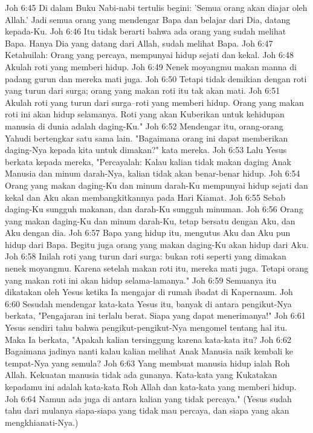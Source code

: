Joh 6:45  Di dalam Buku Nabi-nabi tertulis begini: 'Semua orang akan diajar oleh Allah.' Jadi semua orang yang mendengar Bapa dan belajar dari Dia, datang kepada-Ku.
Joh 6:46  Itu tidak berarti bahwa ada orang yang sudah melihat Bapa. Hanya Dia yang datang dari Allah, sudah melihat Bapa.
Joh 6:47  Ketahuilah: Orang yang percaya, mempunyai hidup sejati dan kekal.
Joh 6:48  Akulah roti yang memberi hidup.
Joh 6:49  Nenek moyangmu makan manna di padang gurun dan mereka mati juga.
Joh 6:50  Tetapi tidak demikian dengan roti yang turun dari surga; orang yang makan roti itu tak akan mati.
Joh 6:51  Akulah roti yang turun dari surga--roti yang memberi hidup. Orang yang makan roti ini akan hidup selamanya. Roti yang akan Kuberikan untuk kehidupan manusia di dunia adalah daging-Ku."
Joh 6:52  Mendengar itu, orang-orang Yahudi bertengkar satu sama lain. "Bagaimana orang ini dapat memberikan daging-Nya kepada kita untuk dimakan?" kata mereka.
Joh 6:53  Lalu Yesus berkata kepada mereka, "Percayalah: Kalau kalian tidak makan daging Anak Manusia dan minum darah-Nya, kalian tidak akan benar-benar hidup.
Joh 6:54  Orang yang makan daging-Ku dan minum darah-Ku mempunyai hidup sejati dan kekal dan Aku akan membangkitkannya pada Hari Kiamat.
Joh 6:55  Sebab daging-Ku sungguh makanan, dan darah-Ku sungguh minuman.
Joh 6:56  Orang yang makan daging-Ku dan minum darah-Ku, tetap bersatu dengan Aku, dan Aku dengan dia.
Joh 6:57  Bapa yang hidup itu, mengutus Aku dan Aku pun hidup dari Bapa. Begitu juga orang yang makan daging-Ku akan hidup dari Aku.
Joh 6:58  Inilah roti yang turun dari surga: bukan roti seperti yang dimakan nenek moyangmu. Karena setelah makan roti itu, mereka mati juga. Tetapi orang yang makan roti ini akan hidup selama-lamanya."
Joh 6:59  Semuanya itu dikatakan oleh Yesus ketika Ia mengajar di rumah ibadat di Kapernaum.
Joh 6:60  Sesudah mendengar kata-kata Yesus itu, banyak di antara pengikut-Nya berkata, "Pengajaran ini terlalu berat. Siapa yang dapat menerimanya!"
Joh 6:61  Yesus sendiri tahu bahwa pengikut-pengikut-Nya mengomel tentang hal itu. Maka Ia berkata, "Apakah kalian tersinggung karena kata-kata itu?
Joh 6:62  Bagaimana jadinya nanti kalau kalian melihat Anak Manusia naik kembali ke tempat-Nya yang semula?
Joh 6:63  Yang membuat manusia hidup ialah Roh Allah. Kekuatan manusia tidak ada gunanya. Kata-kata yang Kukatakan kepadamu ini adalah kata-kata Roh Allah dan kata-kata yang memberi hidup.
Joh 6:64  Namun ada juga di antara kalian yang tidak percaya." (Yesus sudah tahu dari mulanya siapa-siapa yang tidak mau percaya, dan siapa yang akan mengkhianati-Nya.)

